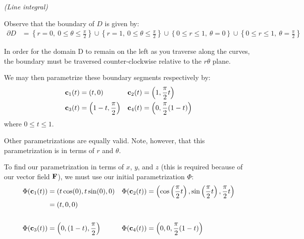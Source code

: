\begin{solution}
    \textit{(Line integral)}
    
    Observe that the boundary of \(D\) is given by:
    \begin{align*}
        \partial D &= \left\{r = 0, \ 0 \leq \theta \leq \frac{\pi}{2}\right\} \cup \left\{r = 1, \ 0 \leq \theta \leq \frac{\pi}{2}\right\} \cup \left\{0 \leq r \leq 1, \ \theta = 0\right\} \cup \left\{0 \leq r \leq 1, \ \theta = \frac{\pi}{2} \right\}
    \end{align*}
    
    In order for the domain D to remain on the left as you traverse along the curves, the boundary must be traversed counter-clockwise relative to the \(r\theta\) plane.
    
    We may then parametrize these boundary segments respectively by:
    \begin{align*}
        \vb{c}_1(t) &= \left(t, 0\right) & \vb{c}_2(t) &= \left(1, \frac{\pi}{2}t\right) \\
        \vb{c}_3(t) &= \left(1 - t, \frac{\pi}{2}\right) & \vb{c}_4(t) &= \left(0, \frac{\pi}{2}(1 - t)\right)
    \end{align*}
    where \(0 \leq t \leq 1\).
    
    Other parametrizations are equally valid. Note, however, that this parametrization is in terms of \(r\) and \(\theta\).
    
    To find our parametrization in terms of \(x\), \(y\), and \(z\) (this is required because of our vector field \(\vb{F}\)), we must use our initial parametrization \(\Phi\):
    \begin{align*}
        \Phi(\vb{c}_1(t)) &= (t \cos(0), t\sin(0), 0) & \Phi(\vb{c}_2(t)) &= \left( \cos\left(\frac{\pi}{2}t\right), \sin\left(\frac{\pi}{2}t\right), \frac{\pi}{2}t\right) \\
        &= (t, 0, 0) \\
        \\
        \Phi(\vb{c}_3(t)) &= \left(0, (1 - t), \frac{\pi}{2}\right) & \Phi(\vb{c}_4(t)) &= \left(0, 0, \frac{\pi}{2}(1 - t)\right)
    \end{align*}
    

\end{solution}
